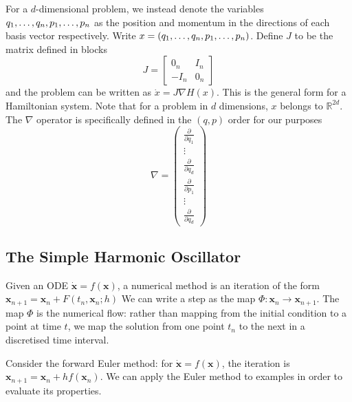 For a $d$-dimensional problem,
we instead denote the variables $q_1, \mathellipsis, q_n, p_1, \mathellipsis, p_n$ as the position and momentum in the directions of each basis vector respectively.
Write $x = (q_1, \mathellipsis, q_n, p_1, \mathellipsis, p_n)$.
Define $J$ to be the matrix defined in blocks
\begin{equation}
	J = \begin{bmatrix}
		{0}_n & {I}_n \\
		-{I}_n & {0}_n
	\end{bmatrix}
\end{equation}
and the problem can be written as ${\dot{x}} = {J}\nabla H({x})$.
This is the general form for a Hamiltonian system.
Note that for a problem in $d$ dimensions,
$x$ belongs to $\mathds{R}^{2d}$.
The $\nabla$ operator is specifically defined in the $(q,p)$ order for our purposes
\begin{equation*}
	\nabla = \begin{pmatrix}
		\frac{\partial}{\partial q_1} \\
		\vdots \\
		\frac{\partial}{\partial q_d} \\
		\frac{\partial}{\partial p_1} \\
		\vdots \\
		\frac{\partial}{\partial q_d}
	\end{pmatrix}
\end{equation*}

\subsection{The Simple Harmonic Oscillator}

Given an ODE $\dot{\mathbf{x}} = f(\mathbf{x})$, a numerical method is an iteration of the form $\mathbf{x}_{n+1} = \mathbf{x}_n + F(t_n, \mathbf{x}_n; h)$
We can write a step as the map $\Phi: \mathbf{x}_n \rightarrow \mathbf{x}_{n+1}$. The map $\Phi$ is the numerical flow:
rather than mapping from the initial condition to a point at time $t$, we map the solution from one point $t_n$ to the next in a discretised time interval.

Consider the forward Euler method: for $\dot{\mathbf{x}} = f(\mathbf{x})$, the iteration is $\mathbf{x}_{n+1} = \mathbf{x}_n + hf(\mathbf{x}_n)$.
We can apply the Euler method to examples in order to evaluate its properties.

